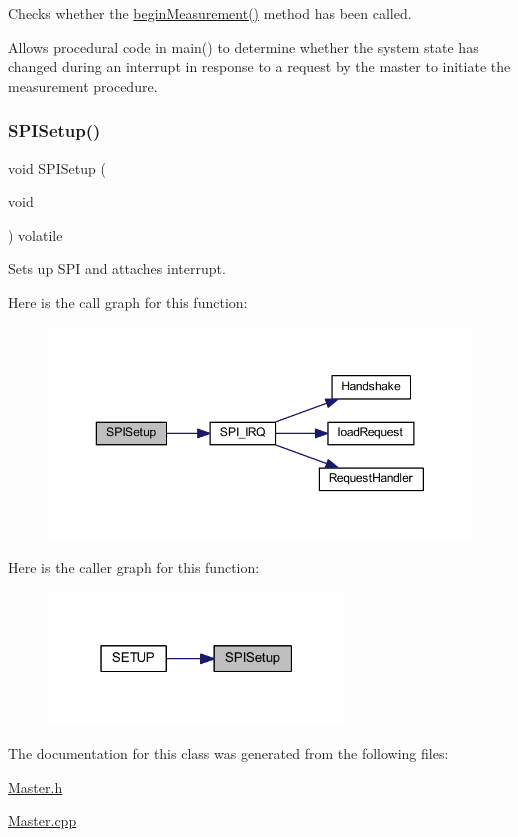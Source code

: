 Checks whether the \mbox{\hyperlink{class_master_a89cc4d6f65ee9922711cde4ed4bdf31c}{begin\+Measurement()}} method has been called. 

Allows procedural code in main() to determine whether the system state has changed during an interrupt in response to a request by the master to initiate the measurement procedure. \mbox{\label{class_master_a23aca637cd51c40ae469a9ee48725edf}} 
\subsubsection{\texorpdfstring{SPISetup()}{SPISetup()}}
{\footnotesize\ttfamily void S\+P\+I\+Setup (\begin{DoxyParamCaption}\item[{void}]{ }\end{DoxyParamCaption}) volatile}



Sets up S\+PI and attaches interrupt. 

Here is the call graph for this function\+:
\nopagebreak
\begin{figure}[H]
\begin{center}
\leavevmode
\includegraphics[width=350pt]{class_master_a23aca637cd51c40ae469a9ee48725edf_cgraph}
\end{center}
\end{figure}
Here is the caller graph for this function\+:
\nopagebreak
\begin{figure}[H]
\begin{center}
\leavevmode
\includegraphics[width=223pt]{class_master_a23aca637cd51c40ae469a9ee48725edf_icgraph}
\end{center}
\end{figure}


The documentation for this class was generated from the following files\+:\begin{DoxyCompactItemize}
\item 
\mbox{\hyperlink{_master_8h}{Master.\+h}}\item 
\mbox{\hyperlink{_master_8cpp}{Master.\+cpp}}\end{DoxyCompactItemize}
